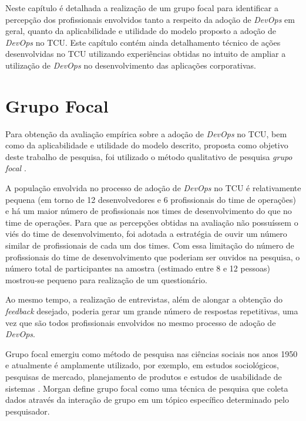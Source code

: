 Neste capítulo é detalhada a realização de um grupo focal \cite{focus_group_handbook,shull2007guide}
para identificar a percepção dos profissionais envolvidos tanto a respeito da
adoção de {\it DevOps} em geral, quanto da aplicabilidade e utilidade do modelo
proposto a adoção de {\it DevOps} no \acrshort{TCU}. Este capítulo contém ainda
detalhamento técnico de ações desenvolvidas no \acrshort{TCU} utilizando
experiências obtidas no intuito de ampliar a utilização de {\it DevOps} no
desenvolvimento das aplicações corporativas.

\section{Grupo Focal}

Para obtenção da avaliação empírica sobre a adoção de {\it DevOps} no \acrshort{TCU},
bem como da aplicabilidade e utilidade do modelo descrito,
proposta como objetivo deste trabalho de pesquisa, foi utilizado o método qualitativo
de pesquisa \emph{grupo focal} \cite{focus_group_handbook}.

A população envolvida no processo de adoção de \textit{DevOps} no TCU é
relativamente pequena (em torno de 12 desenvolvedores e 6 profissionais do time
de operações) e há um maior número de profissionais nos times de
desenvolvimento do que no time de operações. Para que as percepções obtidas
na avaliação não possuíssem o viés do time de desenvolvimento, foi adotada a
estratégia de ouvir um número similar de profissionais de cada um dos times.
Com essa limitação do número de profissionais do time de desenvolvimento que
poderiam ser ouvidos na pesquisa, o número total de participantes na amostra
(estimado entre 8 e 12 pessoas) mostrou-se pequeno para realização de um
questionário.

Ao mesmo tempo, a realização de entrevistas, além de alongar a obtenção do
\textit{feedback} desejado, poderia gerar um grande número de respostas
repetitivas, uma vez que são todos profissionais envolvidos no mesmo processo
de adoção de \textit{DevOps}.

Grupo focal emergiu como método de pesquisa nas ciências sociais nos anos 1950
e atualmente é amplamente utilizado, por exemplo, em estudos sociológicos,
pesquisas de mercado, planejamento de produtos e estudos de usabilidade de
sistemas \cite{shull2007guide}. Morgan \cite{morgan1996focus} define grupo focal
como uma técnica de pesquisa que coleta dados através da interação de grupo em
um tópico específico determinado pelo pesquisador.

